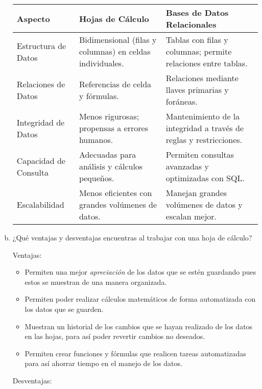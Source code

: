 \documentclass[12pt]{article}
\begin{document}
\begin{enumerate}[a.]
\begin{table}[ht]
    \centering
    \begin{tabularx}{\textwidth}{lX X}
        \toprule
        \textbf{Aspecto} & \textbf{Hojas de Cálculo} & \textbf{Bases de Datos Relacionales} \\
        \midrule
        Estructura de Datos & Bidimensional (filas y columnas) en celdas individuales. & Tablas con filas y columnas; permite relaciones entre tablas. \\
        Relaciones de Datos & Referencias de celda y fórmulas. & Relaciones mediante llaves primarias y foráneas. \\
        Integridad de Datos & Menos rigurosas; propensas a errores humanos. & Mantenimiento de la integridad a través de reglas y restricciones. \\
        Capacidad de Consulta & Adecuadas para análisis y cálculos pequeños. & Permiten consultas avanzadas y optimizadas con SQL. \\
        Escalabilidad & Menos eficientes con grandes volúmenes de datos. & Manejan grandes volúmenes de datos y escalan mejor. \\
        \bottomrule
    \end{tabularx}

\end{table}

\newpage
\item ¿Qué ventajas y desventajas encuentras al trabajar con una hoja de cálculo?

Ventajas:
\begin{itemize}
    \item Permiten una mejor \textit{apreciación} de los datos que se estén guardando pues estos se muestran de una manera organizada.

    \item Permiten poder realizar cálculos matemáticos de forma automatizada con los datos que se guarden.

    \item Muestran un historial de los cambios que se hayan realizado de los datos en las hojas, para así poder revertir cambios no deseados.

    \item Permiten crear funciones y fórmulas que realicen tareas automatizadas para así ahorrar tiempo en el manejo de los datos.

    
\end{itemize}

Desventajas:
\begin{itemize}


\end{itemize}
\end{enumerate}
\end{document}
